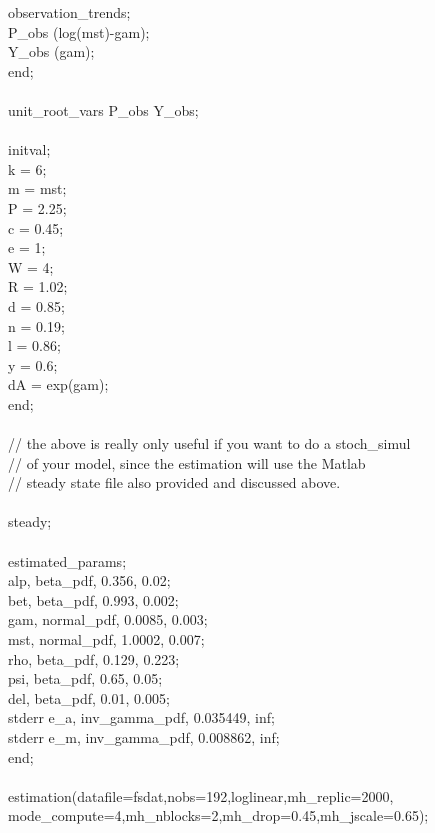 {observation\_trends;\\
P\_obs (log(mst)-gam);\\
Y\_obs (gam);\\
end;\\
\\
unit\_root\_vars P\_obs Y\_obs;\\
\\
initval;\\
k = 6;\\
m = mst;\\
P = 2.25;\\
c = 0.45;\\
e = 1;\\
W = 4;\\
R = 1.02;\\
d = 0.85;\\
n = 0.19;\\
l = 0.86;\\
y = 0.6;\\
dA = exp(gam);\\
end;\\
\\
// the above is really only useful if you want to do a stoch\_simul\\
// of your model, since the estimation will use the Matlab\\
// steady state file also provided and discussed above.\\
\\
steady;\\
\\
estimated\_params;\\
alp, beta\_pdf, 0.356, 0.02; \\ 
bet, beta\_pdf, 0.993, 0.002; \\
gam, normal\_pdf, 0.0085, 0.003; \\
mst, normal\_pdf, 1.0002, 0.007; \\
rho, beta\_pdf, 0.129, 0.223;\\
psi, beta\_pdf, 0.65, 0.05;\\
del, beta\_pdf, 0.01, 0.005;\\
stderr e\_a, inv\_gamma\_pdf, 0.035449, inf;\\
stderr e\_m, inv\_gamma\_pdf, 0.008862, inf;\\
end;\\
\\
estimation(datafile=fsdat,nobs=192,loglinear,mh\_replic=2000,\\
mode\_compute=4,mh\_nblocks=2,mh\_drop=0.45,mh\_jscale=0.65);}\\
\\


